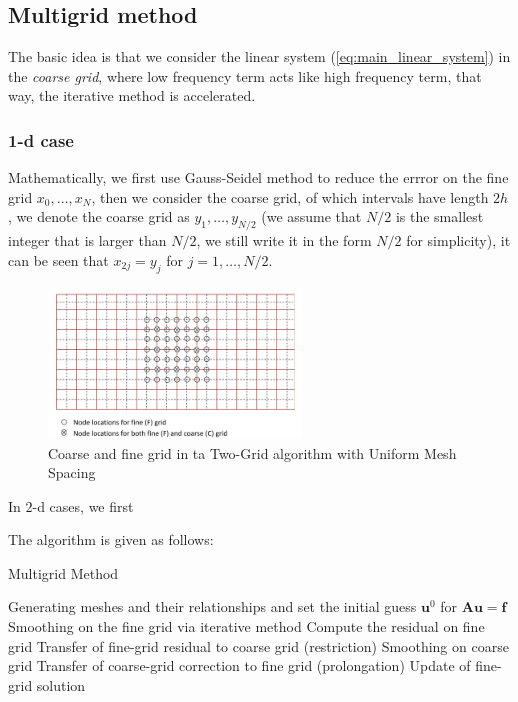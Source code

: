 \documentclass[onecolumn, conference]{IEEEtran}
\begin{document}
\subsection{Multigrid method}
The basic idea is that we consider the linear system (\ref{eq:main_linear_system}) in the \emph{coarse grid}, where low frequency term acts like high frequency term, that way, the iterative method is accelerated. 

\subsubsection{1-d case}

Mathematically, we first use Gauss-Seidel method to reduce the errror on the fine grid $x_0,\dots,x_N$, then we consider the coarse grid, of which intervals have length $2h$, we denote the coarse grid as $y_1,\dots,y_{N/2}$ (we assume that $N/2$ is the smallest integer that is larger than $N/2$, we still write it in the form $N/2$ for simplicity), it can be seen that $x_{2j}=y_{j}$ for $j=1,\dots,N/2$.

\begin{figure}[htbp]
    \centering
    \includegraphics[width=0.6\textwidth]{2d_multigrid.png}
    \caption{Coarse and fine grid in ta Two-Grid algorithm with Uniform Mesh Spacing}
    \label{fig:2d_multigrid}
\end{figure}
In $2$-d cases, we first 



The algorithm is given as follows:

\begin{algorithm}
    \caption{Multigrid Method}
    \begin{algorithmic}[1]
        \REQUIRE Generating meshes and their relationships and set the initial guess $\mathbf{u}^0$ for $\mathbf{A}\mathbf{u}=\mathbf{f}$
            \STATE Smoothing on the fine grid via iterative method
            \STATE Compute the residual on fine grid
            \STATE Transfer of fine-grid residual to coarse grid (restriction)
            \STATE Smoothing on coarse grid
            \STATE Transfer of coarse-grid correction to fine grid (prolongation)
            \STATE Update of fine-grid solution
        \ENDWHILE
        \STATE 
        
    \end{algorithmic}
\end{algorithm}
\end{document}
